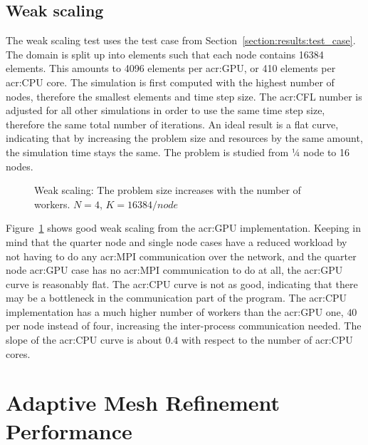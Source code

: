 \subsection{Weak scaling}\label{subsection:results:scaling_tests:weak}

The weak scaling test uses the test case from Section~\ref{section:results:test_case}. The domain is
split up into elements such that each node contains 16384 elements. This amounts to 4096 elements
per \acrshort{acr:GPU}, or 410 elements per \acrshort{acr:CPU} core. The simulation is first
computed with the highest number of nodes, therefore the smallest elements and time step size. The
\acrshort{acr:CFL} number is adjusted for all other simulations in order to use the same time step
size, therefore the same total number of iterations. An ideal result is a flat curve, indicating
that by increasing the problem size and resources by the same amount, the simulation time stays the
same. The problem is studied from ¼ node to 16 nodes.

\begin{figure}[H]
    \centering
    
    \caption{Weak scaling: The problem size increases with the number of workers. \(N = 4\), \(K =
        16384/{node}\)}\label{fig:weak_scaling}
\end{figure}

Figure~\ref{fig:weak_scaling} shows good weak scaling from the \acrshort{acr:GPU} implementation.
Keeping in mind that the quarter node and single node cases have a reduced workload by not having to
do any \acrshort{acr:MPI} communication over the network, and the quarter node \acrshort{acr:GPU}
case has no \acrshort{acr:MPI} communication to do at all, the \acrshort{acr:GPU} curve is
reasonably flat. The \acrshort{acr:CPU} curve is not as good, indicating that there may be a
bottleneck in the communication part of the program. The \acrshort{acr:CPU} implementation has a
much higher number of workers than the \acrshort{acr:GPU} one, \(40\) per node instead of four,
increasing the inter-process communication needed. The slope of the \acrshort{acr:CPU} curve is
about \(0.4\) with respect to the number of \acrshort{acr:CPU} cores. 

\section{Adaptive Mesh Refinement Performance}\label{section:results:adaptivity_performance}

